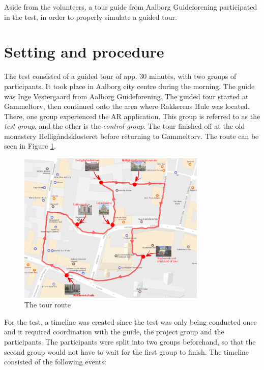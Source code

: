 Aside from the volunteers, a tour guide from Aalborg Guideforening participated in the test, in order to properly simulate a guided tour.

\section{Setting and procedure}
The test consisted of a guided tour of app. 30 minutes, with two groups of participants. It took place in Aalborg city centre during the morning. The guide was Inge Vestergaard from Aalborg Guideforening. The guided tour started at Gammeltorv, then continued onto the area where Rakkerens Hule was located. There, one group experienced the AR application. This group is referred to as the \textit{test group}, and the other is the \textit{control group}. The tour finished off at the old monastery Helligåndsklosteret before returning to Gammeltorv. The route can be seen in Figure \ref{fig:map}.

\begin{figure}[h!]
   \centering
   \includegraphics[width=0.8\textwidth]{figures/Tour_map.png}
   \caption{The tour route}\label{fig:map}
\end{figure}

For the test, a timeline was created since the test was only being conducted once and it required coordination with the guide, the project group and the participants. The participants were split into two groups beforehand, so that the second group would not have to wait for the first group to finish. The timeline consisted of the following events:

